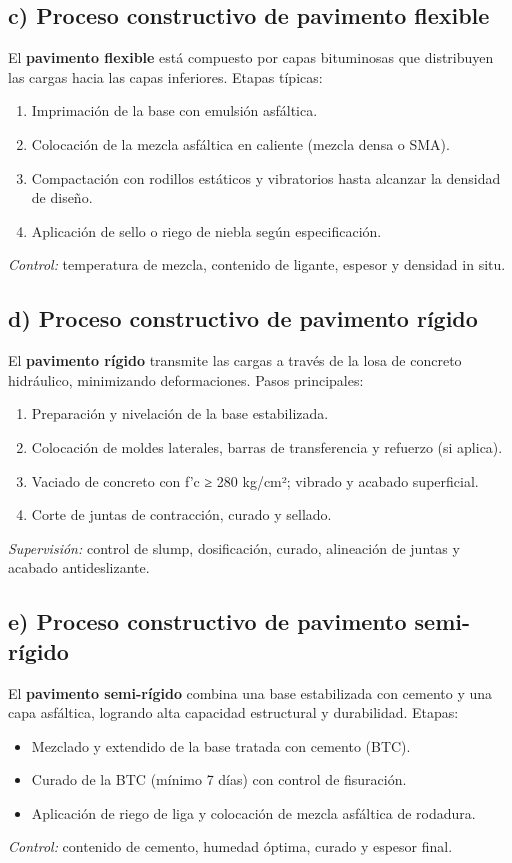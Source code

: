 \documentclass[12pt]{article}
\begin{document}
	\subsection*{c) Proceso constructivo de pavimento flexible}
	El \textbf{pavimento flexible} está compuesto por capas bituminosas que distribuyen las cargas hacia las capas inferiores.  
	Etapas típicas:
	\begin{enumerate}[leftmargin=*, itemsep=2pt]
		\item Imprimación de la base con emulsión asfáltica.
		\item Colocación de la mezcla asfáltica en caliente (mezcla densa o SMA).
		\item Compactación con rodillos estáticos y vibratorios hasta alcanzar la densidad de diseño.
		\item Aplicación de sello o riego de niebla según especificación.
	\end{enumerate}
	\textit{Control:} temperatura de mezcla, contenido de ligante, espesor y densidad in situ.
	
	\subsection*{d) Proceso constructivo de pavimento rígido}
	El \textbf{pavimento rígido} transmite las cargas a través de la losa de concreto hidráulico, minimizando deformaciones.  
	Pasos principales:
	\begin{enumerate}[leftmargin=*, itemsep=2pt]
		\item Preparación y nivelación de la base estabilizada.
		\item Colocación de moldes laterales, barras de transferencia y refuerzo (si aplica).
		\item Vaciado de concreto con f’c ≥ 280 kg/cm²; vibrado y acabado superficial.
		\item Corte de juntas de contracción, curado y sellado.
	\end{enumerate}
	\textit{Supervisión:} control de slump, dosificación, curado, alineación de juntas y acabado antideslizante.
	
	\subsection*{e) Proceso constructivo de pavimento semi-rígido}
	El \textbf{pavimento semi-rígido} combina una base estabilizada con cemento y una capa asfáltica, logrando alta capacidad estructural y durabilidad.  
	Etapas:
	\begin{itemize}[leftmargin=*, itemsep=2pt]
		\item Mezclado y extendido de la base tratada con cemento (BTC).
		\item Curado de la BTC (mínimo 7 días) con control de fisuración.
		\item Aplicación de riego de liga y colocación de mezcla asfáltica de rodadura.
	\end{itemize}
	\textit{Control:} contenido de cemento, humedad óptima, curado y espesor final.
	
\end{document}
